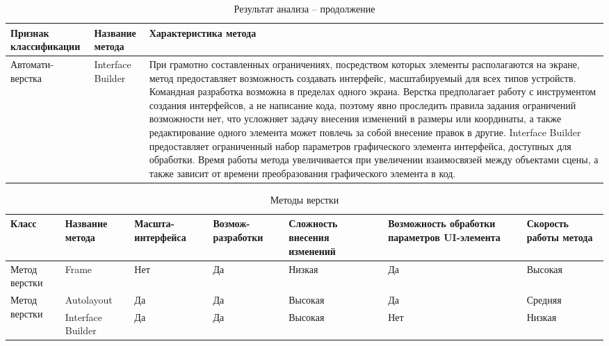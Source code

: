 \begin{table}[H]
	\centering
	\caption{Результат анализа -- продолжение}
	\label{mko_table_0}
	\begin{tabular}{|p{3.3cm}|p{2.9cm}|p{9.5cm}|}
		\hline
		\textbf{Признак классификации} & \textbf{Название метода} & \textbf{Характеристика метода} \\
		\hline
		\multirow{2}{2.9cm}{Автомати- верстка} & Interface Builder & 
		При грамотно составленных ограничениях, посредством которых элементы располагаются на экране, метод предоставляет 
		возможность создавать интерфейс, масштабируемый для всех типов устройств. Командная разработка возможна в пределах одного 
		экрана. Верстка предполагает работу с инструментом создания интерфейсов, а не написание кода, поэтому явно проследить 
		правила задания ограничений возможности нет, что усложняет задачу внесения изменений в размеры или координаты, 
		а также редактирование одного элемента может повлечь за собой внесение правок в другие. Interface Builder предоставляет 
		ограниченный набор параметров графического элемента интерфейса, доступных для обработки. 
		Время работы метода увеличивается при увеличении взаимосвязей между объектами сцены, а также зависит от времени 
		преобразования графического элемента в код.\\
		\hline
	\end{tabular}

\end{table}

\begin{landscape}
\begin{table}[H]
	\centering
	\caption{Методы верстки}
	\label{mko_table_0}
	\begin{tabular}{|p{2.8cm}|p{2.8cm}|p{3.0cm}|p{3.0cm}|p{2.8cm}|p{3.3cm}|p{2.8cm}|}
		\hline
		\textbf{Класс } & \textbf{Название метода} & \textbf{Масшта- интерфейса} & 
		\textbf{Возмож-  разработки} & \textbf{Сложность внесения изменений} & 
		\textbf{Возможность обработки параметров \linebreak UI-элемента} & \textbf{Скорость работы метода} \\
		\hline
		{Метод  верстки} & 
		Frame & 
		Нет & Да & Низкая & Да & Высокая \\
		\hline
		\multirow{2}{2.9cm}{Метод  верстки} 
		& Autolayout 
		& Да & Да & Высокая & Да & Средняя \\
		\cline{2-7} & Interface Builder 
		& Да & Да & Высокая & Нет & Низкая \\
		\hline
	\end{tabular}
\end{table}
\end{landscape}
